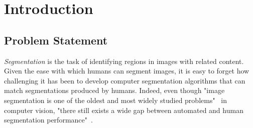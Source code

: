 \fancyhead[RO,LE]{\thepage}
\fancyfoot{} 
\chapter{Introduction}

\section{Problem Statement}

\emph{Segmentation} is the task of identifying regions in images  with related content. Given the ease with which humans can segment images, it is easy to forget how challenging it has been to develop computer segmentation algorithms that can match segmentations produced by humans. Indeed, even though
"image segmentation is one of the oldest and most widely studied problems"~\cite{Szeliski-2010} in computer vision, "there still exists a wide gap between automated and human segmentation performance"~\cite{Szeliski-2010}.

